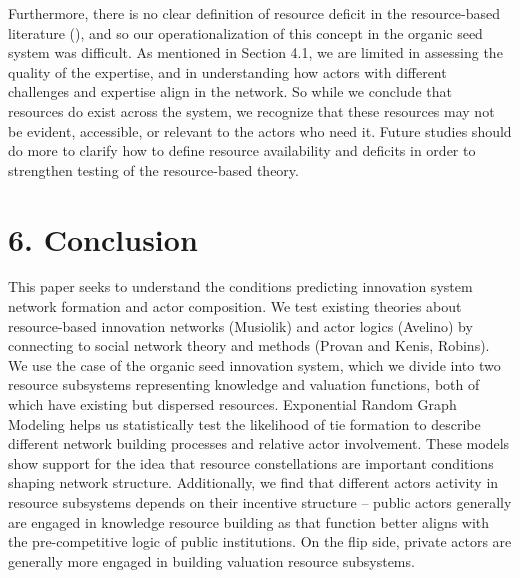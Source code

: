 \documentclass[twoside,12pt,final]{ucthesis-CA2012}
\begin{document}
\begin{ucmainmatter}
Furthermore, there is no clear definition of resource deficit in the
resource-based literature (), and so our operationalization of this
concept in the organic seed system was difficult. As mentioned in
Section 4.1, we are limited in assessing the quality of the expertise,
and in understanding how actors with different challenges and expertise
align in the network. So while we conclude that resources do exist
across the system, we recognize that these resources may not be evident,
accessible, or relevant to the actors who need it. Future studies should
do more to clarify how to define resource availability and deficits in
order to strengthen testing of the resource-based theory.

\hypertarget{conclusion-1}{%
\section{6. Conclusion}\label{conclusion-1}}

This paper seeks to understand the conditions predicting innovation
system network formation and actor composition. We test existing
theories about resource-based innovation networks (Musiolik) and actor
logics (Avelino) by connecting to social network theory and methods
(Provan and Kenis, Robins). We use the case of the organic seed
innovation system, which we divide into two resource subsystems
representing knowledge and valuation functions, both of which have
existing but dispersed resources. Exponential Random Graph Modeling
helps us statistically test the likelihood of tie formation to describe
different network building processes and relative actor involvement.
These models show support for the idea that resource constellations are
important conditions shaping network structure. Additionally, we find
that different actors\textquotesingle{} activity in resource subsystems depends on their
incentive structure -- public actors generally are engaged in knowledge
resource building as that function better aligns with the
pre-competitive logic of public institutions. On the flip side, private
actors are generally more engaged in building valuation resource
subsystems.


\end{ucmainmatter}
\end{document}
